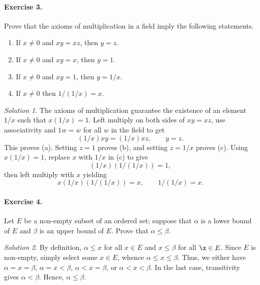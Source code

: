 \documentclass[11pt]{report}
\theoremstyle{remark}
\newtheorem*{solution}{Solution}
\begin{document}
    \paragraph{Exercise 3.} Prove that the axioms of multiplication in a field imply
    the following statements.
    \begin{enumerate}
        \itemsep0em
        \item If $x \neq 0$ and $xy = xz$, then $y = z$.
        \item If $x \neq 0$ and $xy = x$, then $y = 1$.
        \item If $x \neq 0$ and $xy = 1$, then $y = 1 / x$.
        \item If $x \neq 0$ then $1 / (1 / x) = x$.
    \end{enumerate}
    \begin{solution}
        The axioms of multiplication guarantee the existence of an element $1 / x$
        such that $x (1 / x) = 1$. Left multiply on both sides of $xy = xz$, use
        associativity and $1w = w$ for all $w$ in the field to get \[
            (1 / x)xy = (1 / x)xz, \qquad y = z.
        \] This proves (a). Setting $z = 1$ proves (b), and setting $z = 1 / x$
        proves (c). Using $x(1 / x) = 1$, replace $x$ with $1 / x$ in (c)
        to give \[
            (1 / x)(1 / (1 / x)) = 1,
        \] then left multiply with $x$ yielding \[
            x(1 / x)(1 / (1 / x)) = x, \qquad 1 / (1 / x) = x.
        \] 
    \end{solution}
    
    \paragraph{Exercise 4.} Let $E$ be a non-empty subset of an ordered set; suppose
    that $\alpha$ is a lower bound of $E$ and $\beta$ is an upper bound of $E$.
    Prove that $\alpha \leq \beta$.
    \begin{solution}
        By definition, $\alpha \leq x$ for all $x \in E$ and $x \leq \beta$ for all
        $\x \in E$. Since $E$ is non-empty, simply select some $x \in E$, whence
        $\alpha \leq x \leq \beta$. Thus, we either have $\alpha = x = \beta$,
        $\alpha = x < \beta$, $\alpha < x = \beta$, or $\alpha < x < \beta$.
        In the last case, transitivity gives $\alpha < \beta$. Hence, $\alpha \leq
        \beta$.
    \end{solution}
\end{document}
